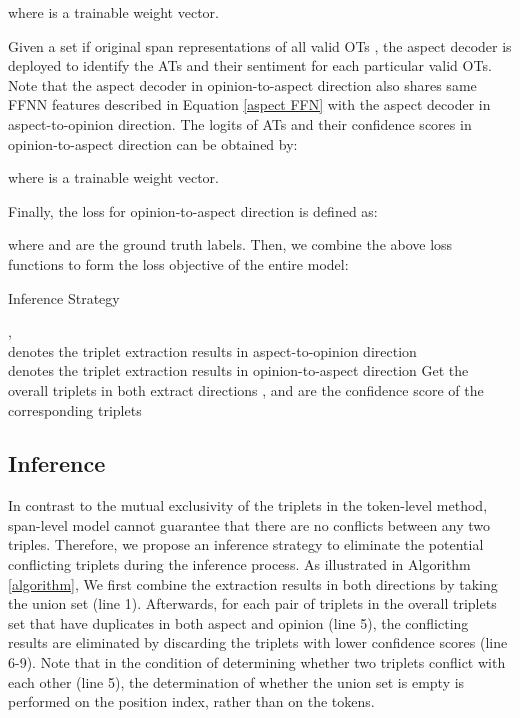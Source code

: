 \documentclass[11pt]{article}
\begin{document}
where  is a trainable weight vector. 

Given a set  if original span representations of all valid OTs , the aspect decoder is deployed to identify the ATs and their sentiment for each particular valid OTs. Note that the aspect decoder in opinion-to-aspect direction also shares same FFNN features described in Equation \eqref{aspect FFN} with the aspect decoder in aspect-to-opinion direction. The logits of ATs and their confidence scores in opinion-to-aspect direction can be obtained by:



where  is a trainable weight vector. 

Finally, the loss for opinion-to-aspect direction is defined as:

where  and  are the ground truth labels. Then, we combine the above loss functions to form the loss objective of the entire model:


\begin{algorithm}[t] 
	\caption{Inference Strategy}
	\renewcommand{\algorithmicrequire}{\textbf{Input:}}
	\renewcommand{\algorithmicensure}{\textbf{Output:}}
	\begin{algorithmic}[1] \label{algorithm}
		\REQUIRE , \\
		 denotes the triplet extraction results in aspect-to-opinion direction \\
		 denotes the triplet extraction results in opinion-to-aspect direction
		\STATE Get the overall triplets in both extract directions 
		\FOR {}
		\FOR {}
		\STATE ,  and  are the confidence score of the corresponding triplets
		\IF { \AND }
		\IF {}
		\STATE 
		\ELSE
		\STATE 
		\ENDIF
		\ENDIF
		\ENDFOR
		\ENDFOR
		\RETURN 
	\end{algorithmic}
\end{algorithm}

\subsection{Inference} \label{infer}
In contrast to the mutual exclusivity of the triplets in the token-level method, span-level model cannot guarantee that there are no conflicts between any two triples. Therefore, we propose an inference strategy to eliminate the potential conflicting triplets during the inference process. As illustrated in Algorithm \ref{algorithm}, We first combine the extraction results in both directions by taking the union set  (line 1). Afterwards, for each pair of triplets in the overall triplets set  that have duplicates in both aspect  and opinion  (line 5), the conflicting results are eliminated by discarding the triplets with lower confidence scores  (line 6-9). Note that in the condition of determining whether two triplets conflict with each other (line 5), the determination of whether the union set is empty is performed on the position index, rather than on the tokens.
\end{document}
